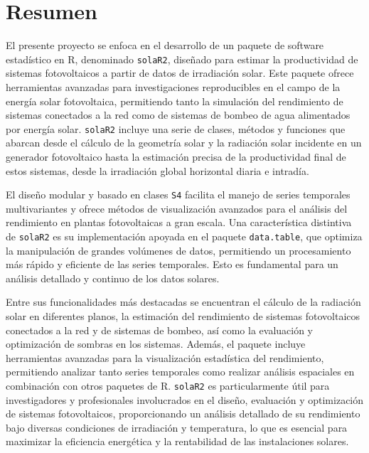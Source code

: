 \chapter*{Resumen}
El presente proyecto se enfoca en el desarrollo de un paquete de software estadístico en R, denominado \texttt{solaR2}, diseñado para estimar la productividad de sistemas fotovoltaicos a partir de datos de irradiación solar. Este paquete ofrece herramientas avanzadas para investigaciones reproducibles en el campo de la energía solar fotovoltaica, permitiendo tanto la simulación del rendimiento de sistemas conectados a la red como de sistemas de bombeo de agua alimentados por energía solar. \texttt{solaR2} incluye una serie de clases, métodos y funciones que abarcan desde el cálculo de la geometría solar y la radiación solar incidente en un generador fotovoltaico hasta la estimación precisa de la productividad final de estos sistemas, desde la irradiación global horizontal diaria e intradía.

El diseño modular y basado en clases \texttt{S4} facilita el manejo de series temporales multivariantes y ofrece métodos de visualización avanzados para el análisis del rendimiento en plantas fotovoltaicas a gran escala. Una característica distintiva de \texttt{solaR2} es su implementación apoyada en el paquete \texttt{data.table}, que optimiza la manipulación de grandes volúmenes de datos, permitiendo un procesamiento más rápido y eficiente de las series temporales. Esto es fundamental para un análisis detallado y continuo de los datos solares.

Entre sus funcionalidades más destacadas se encuentran el cálculo de la radiación solar en diferentes planos, la estimación del rendimiento de sistemas fotovoltaicos conectados a la red y de sistemas de bombeo, así como la evaluación y optimización de sombras en los sistemas. Además, el paquete incluye herramientas avanzadas para la visualización estadística del rendimiento, permitiendo analizar tanto series temporales como realizar análisis espaciales en combinación con otros paquetes de R. \texttt{solaR2} es particularmente útil para investigadores y profesionales involucrados en el diseño, evaluación y optimización de sistemas fotovoltaicos, proporcionando un análisis detallado de su rendimiento bajo diversas condiciones de irradiación y temperatura, lo que es esencial para maximizar la eficiencia energética y la rentabilidad de las instalaciones solares.

